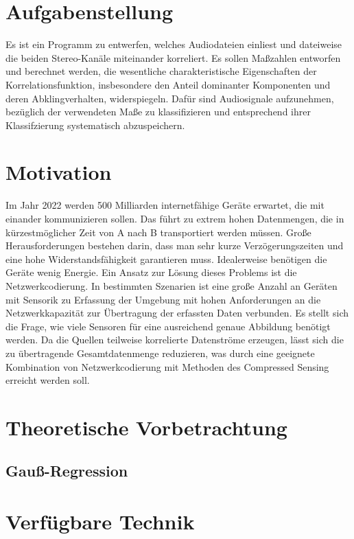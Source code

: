 \section{Aufgabenstellung}
Es ist ein Programm zu entwerfen, welches Audiodateien einliest und dateiweise die beiden Stereo-Kanäle miteinander korreliert. Es sollen Maßzahlen entworfen und berechnet werden, die wesentliche charakteristische Eigenschaften der Korrelationsfunktion, insbesondere den Anteil dominanter Komponenten und deren Abklingverhalten, widerspiegeln. Dafür sind Audiosignale aufzunehmen, bezüglich der verwendeten Maße zu klassifizieren und entsprechend ihrer Klassifzierung systematisch abzuspeichern.
\section{Motivation}
Im Jahr 2022 werden 500 Milliarden internetfähige Geräte erwartet, die mit einander kommunizieren sollen. Das führt zu extrem hohen Datenmengen, die in kürzestmöglicher Zeit von A nach B transportiert werden müssen. Große Herausforderungen bestehen darin, dass man sehr kurze Verzögerungszeiten und eine hohe Widerstandsfähigkeit garantieren muss. Idealerweise benötigen die Geräte wenig Energie. Ein Ansatz zur Lösung dieses Problems ist die Netzwerkcodierung.\newline
In bestimmten Szenarien ist eine große Anzahl an Geräten mit Sensorik zu Erfassung der Umgebung mit hohen Anforderungen an die Netzwerkkapazität zur Übertragung der erfassten Daten verbunden. Es stellt sich die Frage, wie viele Sensoren für eine ausreichend genaue Abbildung benötigt werden. Da die Quellen teilweise korrelierte Datenströme erzeugen, lässt sich die zu übertragende Gesamtdatenmenge reduzieren, was durch eine geeignete Kombination von Netzwerkcodierung mit Methoden des Compressed Sensing erreicht werden soll.

\section{Theoretische Vorbetrachtung}


\subsection{Gauß-Regression}

\section{Verfügbare Technik}

